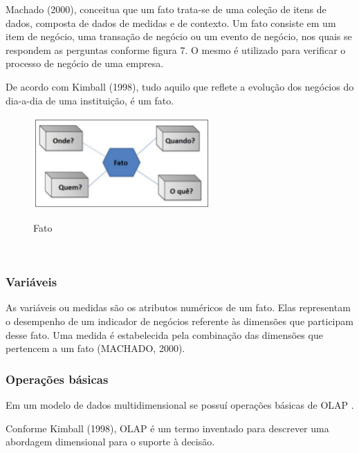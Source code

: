 Machado (2000), conceitua que um fato trata-se de uma coleção de itens de dados, composta de dados de medidas e de contexto. Um fato consiste em um item de negócio, uma transação de negócio ou um evento de negócio, nos quais se respondem as perguntas conforme figura 7. O mesmo é utilizado para verificar o processo de negócio de uma empresa.

De acordo com Kimball (1998), tudo aquilo que reflete a evolução dos negócios do dia-a-dia de uma instituição, é um fato.

\begin{figure}[H]
	\vspace*{0,2cm}
    \centering
    \caption{Fato}
    \includegraphics[width=0.6\textwidth]{./04-figuras/figura-07}
    \label{fig:ilustfig07}
\end{figure}
\vspace*{-0,9cm}
{\raggedright {}} \\

\subsubsection{Vari\'{a}veis}

As variáveis ou medidas são os atributos numéricos de um fato. Elas representam o desempenho de um indicador de negócios referente às dimensões que participam desse fato. Uma medida é estabelecida pela combinação das dimensões que pertencem a um fato (MACHADO, 2000).

\subsubsection{Opera\c{c}ões b\'{a}sicas}

Em um modelo de dados multidimensional se possuí operações básicas de 
OLAP .

Conforme Kimball (1998), OLAP é um termo inventado para descrever uma abordagem dimensional para o suporte à decisão.

